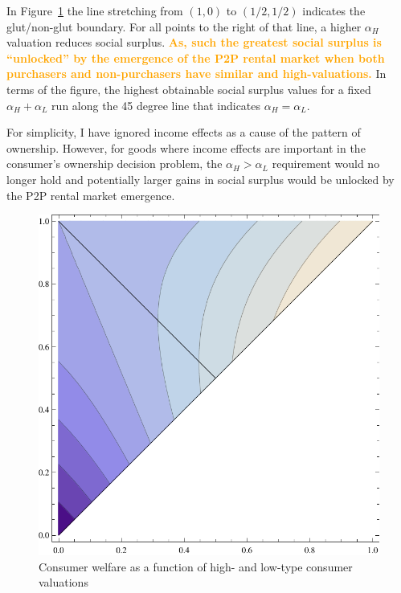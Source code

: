 \documentclass[11pt]{article}
\newcommand{\important}[1]{\textcolor{orange}{\textbf{#1}}}
\begin{document}
In Figure~\ref{fig:welfare} the line stretching from $(1,0)$ to $(1/2, 1/2)$ indicates the glut/non-glut boundary. 
For all points to the right of that line, a higher $\alpha_H$ valuation reduces social surplus.  
\important{As, such the greatest social surplus is ``unlocked'' by the emergence of the P2P rental market when both purchasers and non-purchasers have similar and high-valuations.} 
In terms of the figure, the highest obtainable social surplus values for a fixed $\alpha_H + \alpha_L$ run along the 45 degree line that indicates $\alpha_H = \alpha_L$. 

For simplicity, I have ignored income effects as a cause of the pattern of ownership. 
However, for goods where income effects are important in the consumer's ownership decision problem, the $\alpha_H > \alpha_L$ requirement would no longer hold and potentially larger gains in social surplus would be unlocked by the P2P rental market emergence. 

\begin{figure}
\centering 
\caption{Consumer welfare as a function of high- and low-type consumer valuations}
\label{fig:welfare}
\begin{minipage}{0.50 \linewidth}
\includegraphics[width = \linewidth]{./plots/welfare.pdf}
\end{minipage} 
\end{figure} 
\end{document}
